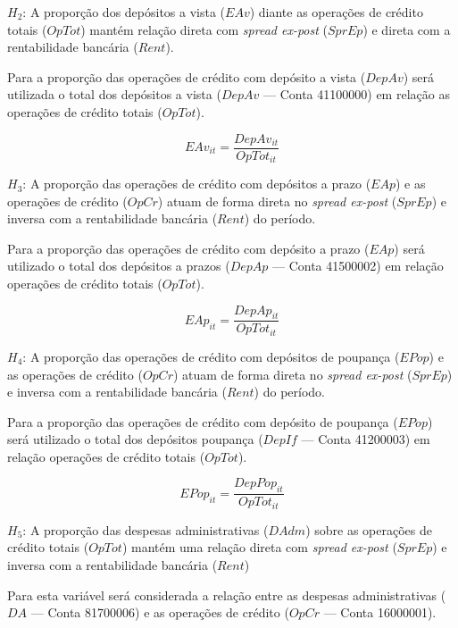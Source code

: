 \documentclass[
  12pt,
  12pt,
  openright,
  oneside,
  a4paper,
  chapter=TITLE,
  section=TITLE,
  subsection=TITLE,
  subsubsection=TITLE,
  english,
  portugues,
  sumario=tradicional]{abntex2}
\begin{document}
\(H_{2}\): A proporção dos depósitos a vista (\(EAv\)) diante as operações de crédito totais (\(OpTot\)) mantém relação direta com \emph{spread ex-post} (\(SprEp\)) e direta com a rentabilidade bancária (\(Rent\)).

Para a proporção das operações de crédito com depósito a vista (\(DepAv\)) será utilizada o total dos depósitos a vista (\(DepAv\) --- Conta 41100000) em relação as operações de crédito totais (\(OpTot\)).

\begin{equation}
EAv_{it} = \frac{DepAv_{it}}{OpTot_{it}}
\end{equation}

\(H_{3}\): A proporção das operações de crédito com depósitos a prazo (\(EAp\)) e as operações de crédito (\(OpCr\)) atuam de forma direta no \emph{spread ex-post} (\(SprEp\)) e inversa com a rentabilidade bancária (\(Rent\)) do período.

Para a proporção das operações de crédito com depósito a prazo (\(EAp\)) será utilizado o total dos depósitos a prazos (\(DepAp\) --- Conta 41500002) em relação operações de crédito totais (\(OpTot\)).

\begin{equation}
EAp_{it} = \frac{DepAp_{it}}{OpTot_{it}}
\end{equation}

\(H_{4}\): A proporção das operações de crédito com depósitos de poupança (\(EPop\)) e as operações de crédito (\(OpCr\)) atuam de forma direta no \emph{spread ex-post} (\(SprEp\)) e inversa com a rentabilidade bancária (\(Rent\)) do período.

Para a proporção das operações de crédito com depósito de poupança (\(EPop\)) será utilizado o total dos depósitos poupança (\(DepIf\) --- Conta 41200003) em relação operações de crédito totais (\(OpTot\)).

\begin{equation}
EPop_{it} = \frac{DepPop_{it}}{OpTot_{it}}
\end{equation}

\(H_{5}\): A proporção das despesas administrativas (\(DAdm\)) sobre as operações de crédito totais (\(OpTot\)) mantém uma relação direta com \emph{spread ex-post} (\(SprEp\)) e inversa com a rentabilidade bancária (\(Rent\))

Para esta variável será considerada a relação entre as despesas administrativas (\(DA\) --- Conta 81700006) e as operações de crédito (\(OpCr\) --- Conta 16000001).
\end{document}
